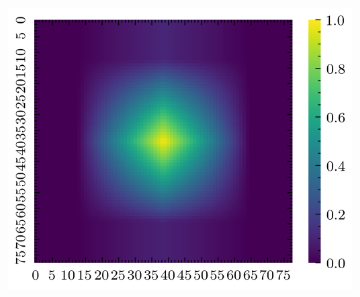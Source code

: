 \documentclass[../document.tex]{subfiles}
\begin{document}
\begin{figure}[H]
\begin{subfigure}[b]{0.19\textwidth}
        \includegraphics[width=\linewidth]{../img/5/quarry/false_negative/grad-cam-2d-4.png}
    \end{subfigure}  


\end{figure}
\end{document}

